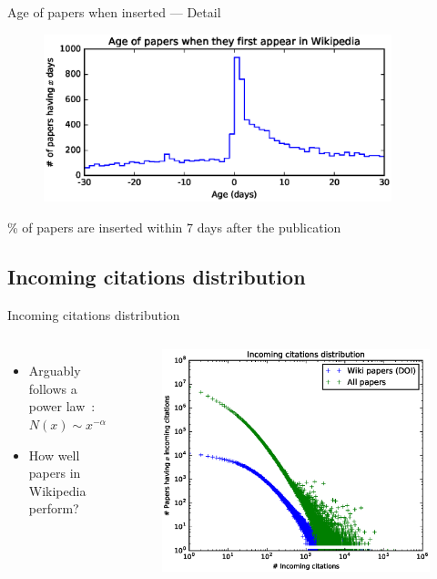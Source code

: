 \documentclass{beamer}
\begin{document}
\begin{frame}{Age of papers when inserted --- Detail}
    \begin{figure}
    \centering
    \includegraphics[width=0.9\textwidth]{assets/age_of_papers_at_first_appearance_pdf_near0_slides}
    \end{figure}
    \% of papers are inserted within 7 days after the publication
\end{frame}


\subsection{Incoming citations distribution}
\begin{frame}{Incoming citations distribution}
    \begin{columns}
        \begin{itemize}
            \item Arguably follows a power law~\cite{Redner1998}: $N(x) \sim x^{-\alpha}$
            \item How well papers in Wikipedia perform?
        \end{itemize}
        \begin{figure}
        \centering
        \includegraphics[width=1\textwidth]{assets/incoming_citations_distribution_pdf_slides}
        \end{figure}
    \end{columns}

\end{frame}
\end{document}
